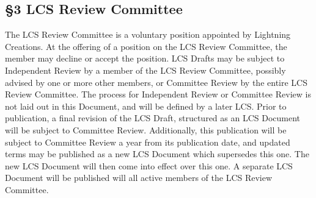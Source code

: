 \documentclass[
]{article}
\begin{document}
\hypertarget{lcs-review-committee}{%
\subsection{§3 LCS Review Committee}\label{lcs-review-committee}}

The LCS Review Committee is a voluntary position appointed by Lightning
Creations. At the offering of a position on the LCS Review Committee,
the member may decline or accept the position. LCS Drafts may be subject
to Independent Review by a member of the LCS Review Committee, possibly
advised by one or more other members, or Committee Review by the entire
LCS Review Committee. The process for Independent Review or Committee
Review is not laid out in this Document, and will be defined by a later
LCS. Prior to publication, a final revision of the LCS Draft, structured
as an LCS Document will be subject to Committee Review. Additionally,
this publication will be subject to Committee Review a year from its
publication date, and updated terms may be published as a new LCS
Document which supersedes this one. The new LCS Document will then come
into effect over this one. A separate LCS Document will be published
will all active members of the LCS Review Committee.
\end{document}
